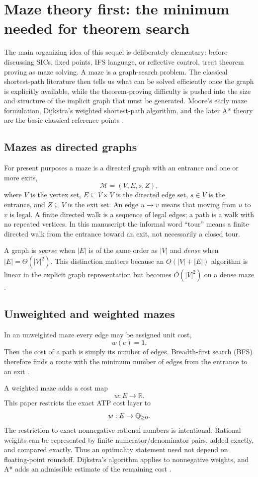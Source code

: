 \section{Maze theory first: the minimum needed for theorem search}
The main organizing idea of this sequel is deliberately elementary: before discussing SICs, fixed points, IFS language, or reflective control, treat theorem proving as maze solving. A maze is a graph-search problem. The classical shortest-path literature then tells us what can be solved efficiently once the graph is explicitly available, while the theorem-proving difficulty is pushed into the size and structure of the implicit graph that must be generated. Moore's early maze formulation, Dijkstra's weighted shortest-path algorithm, and the later A* theory are the basic classical reference points \cite{moore,dijkstra,astar,clrs}.

\subsection{Mazes as directed graphs}
For present purposes a maze is a directed graph with an entrance and one or more exits,
\[
\mathcal M=(V,E,s,Z),
\]
where $V$ is the vertex set, $E\subseteq V\times V$ is the directed edge set, $s\in V$ is the entrance, and $Z\subseteq V$ is the exit set. An edge $u\to v$ means that moving from $u$ to $v$ is legal. A finite directed walk is a sequence of legal edges; a path is a walk with no repeated vertices. In this manuscript the informal word ``tour'' means a finite directed walk from the entrance toward an exit, not necessarily a closed tour.

A graph is \emph{sparse} when $|E|$ is of the same order as $|V|$ and \emph{dense} when $|E|=\Theta(|V|^2)$. This distinction matters because an $O(|V|+|E|)$ algorithm is linear in the explicit graph representation but becomes $O(|V|^2)$ on a dense maze \cite{clrs}.

\subsection{Unweighted and weighted mazes}
In an unweighted maze every edge may be assigned unit cost,
\[
w(e)=1.
\]
Then the cost of a path is simply its number of edges. Breadth-first search (BFS) therefore finds a route with the minimum number of edges from the entrance to an exit \cite{moore,clrs}.

A weighted maze adds a cost map
\[
w:E\to\mathbb R.
\]
This paper restricts the exact ATP cost layer to
\[
w:E\to\mathbb{Q}_{\ge 0}.
\]
The restriction to exact nonnegative rational numbers is intentional. Rational weights can be represented by finite numerator/denominator pairs, added exactly, and compared exactly. Thus an optimality statement need not depend on floating-point roundoff. Dijkstra's algorithm applies to nonnegative weights, and A* adds an admissible estimate of the remaining cost \cite{dijkstra,astar,clrs}.

